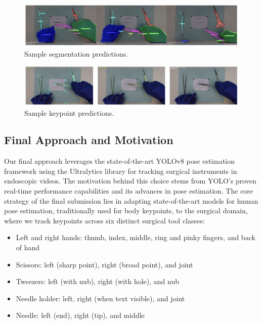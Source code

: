 \documentclass[11pt]{article}
\begin{document}
\begin{figure}[t]
    \centering
    \includegraphics[width=1\linewidth]{segmentation.png}
    \caption{Sample segmentation predictions.}
    \label{fig:segmentation}
\end{figure}

\begin{figure}[t]
    \centering
    \includegraphics[width=1\linewidth]{keypoints.png}
    \caption{Sample keypoint predictions.}
    \label{fig:keypoints}
\end{figure}

\subsection{Final Approach and Motivation}

Our final approach leverages the state-of-the-art YOLOv8 pose estimation framework \cite{yaseen_what_2024} using the Ultralytics library \cite{ultralytics_yolov8_nodate} for tracking surgical instruments in endoscopic videos. The motivation behind this choice stems from YOLO's proven real-time performance capabilities and its advances in pose estimation. The core strategy of the final submission lies in adapting state-of-the-art models for human pose estimation, traditionally used for body keypoints, to the surgical domain, where we track keypoints across six distinct surgical tool classes:
\begin{itemize}[noitemsep]
    \item Left and right hands: thumb, index, middle, ring and pinky fingers, and back of hand
    \item Scissors: left (sharp point), right (broad point), and joint
    \item Tweezers: left (with nub), right (with hole), and nub
    \item Needle holder: left, right (when text visible), and joint
    \item Needle: left (end), right (tip), and middle
\end{itemize}
\end{document}
